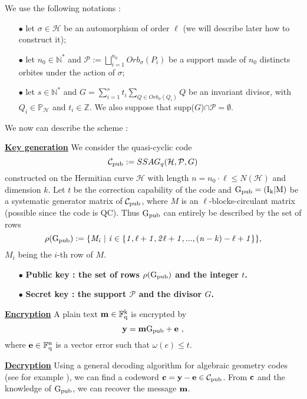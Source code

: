 \documentclass[10pt]{article}
\newcommand{\s}{\vspace{0.3cm}}
\newcommand{\cd}{\cdot}
\newcommand{\N}{\mathbb{N}}
\newcommand{\Z}{\mathbb{Z}}
\newcommand{\fq}{\mathbb{F}_q}
\newcommand{\w}{\omega}
\newcommand{\PR}{\mathcal{P}}
\begin{document}
\s

We use the following notations : 
\begin{enumerate}
\item[$\bullet$] let $\sigma \in \mathcal{H}$ be an automorphism of order $\ell$ (we will describe later how to construct it);
\item[$\bullet$] let $n_0 \in \N^* $ and $\PR := \bigsqcup\limits_{i=1}^{n_0} Orb_{\sigma}(P_i)$ be a support made of $n_0$ distincts orbites under the action of $\sigma$;
\item[$\bullet$] let $s \in \N^*$ and $G = \sum\limits_{i=1}^s t_i \sum\limits_{Q \in Orb_{\sigma}(Q_i)} Q$ be an invariant divisor, with $Q_i \in \mathbb{P}_{\mathcal{H}}$ and $t_i \in \Z$. We also suppose that supp($G$)$\cap \PR = \emptyset$.
\end{enumerate}

We now can describe the scheme :

\s 

\underline{\bf{Key generation}} We consider the quasi-cyclic code 
\[\mathcal{C}_{\rm pub} := SSAG_q(\mathcal{H},\PR,G)\]
constructed on the Hermitian curve $\mathcal{H}$ with length $n=n_0 \cd \ell\leq N(\mathcal{H})$ and dimension $k$. Let $t$ be the correction capability of the code and $\rm G_{pub} = (I_k | M)$ be a systematic generator matrix of $\mathcal{C}_{\rm pub}$, where $M$ is an $\ell$-blocks-circulant matrix (possible since the code is QC). Thus $\rm G_{pub}$ can entirely be described by the set of rows
\[\rho(\rm G_{pub}) \it := \{M_i \ | \ i \in \{1,\ell+1,2\ell+1,...,(n-k)-\ell+1\}\},\]
$M_i$ being the $i$-th row of $M$. 

\begin{enumerate}
\item[$\bullet$] \bf{Public key} : \rm the set of rows $\rho(\rm G_{pub})$ and the integer $t$.
\item[$\bullet$] \bf{Secret key} : \rm the support $\PR$ and the divisor $G$.
\end{enumerate}

\s

\underline{\bf{Encryption}} A plain text $\bf{m} \rm \in \fq^k$ is encrypted by 
\[ \bf{y} \rm = \bf{m} \it \rm G_{pub} \it + \bf{e} \ ,\]
where $\bf{e} \rm \in \fq^n$ is a vector error such that $\w(e) \leq t$.

\s

\underline{\bf{Decryption}} Using a general decoding algorithm for algebraic geometry codes (see for example \cite{THRP}), we can find a codeword $\bf{c} \rm = \rm \bf{y - e} \rm \in \mathcal{C}_{\rm pub}$. From $\bf{c}$ and the knowledge of $\rm G_{pub}$, we can recover the message $\bf{m}$.
\end{document}
